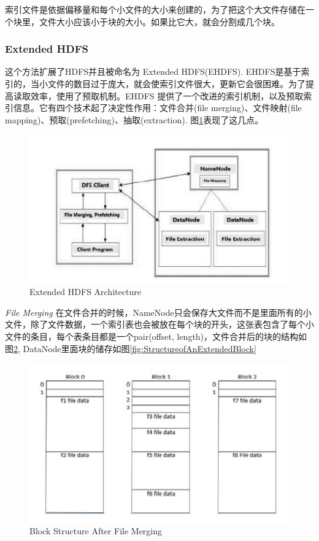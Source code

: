 \documentclass[UTF8]{ctexart}
\begin{document}
索引文件是依据偏移量和每个小文件的大小来创建的，为了把这个大文件存储在一个块里，文件大小应该小于块的大小。如果比它大，就会分割成几个块。


\subsubsection{Extended HDFS}
这个方法\cite{Gurav}扩展了HDFS并且被命名为 Extended HDFS(EHDFS). EHDFS是基于索引的，当小文件的数目过于庞大，就会使索引文件很大，更新它会很困难。为了提高读取效率，使用了预取机制。EHDFS 提供了一个改进的索引机制，以及预取索引信息。它有四个技术起了决定性作用：文件合并(file merging)、文件映射(file mapping)、预取(prefetching)、抽取(extraction). 图\ref{fig:ExtendedHDFSArchitecture}表现了这几点。

\begin{figure}[h]
\centering
\includegraphics{ExtendedHDFSArchitecture.PNG}
\caption{Extended HDFS Architecture}
\label{fig:ExtendedHDFSArchitecture}
\end{figure}

\emph{File Merging}
在文件合并的时候，NameNode只会保存大文件而不是里面所有的小文件，除了文件数据，一个索引表也会被放在每个块的开头，这张表包含了每个小文件的条目，每个表条目都是一个pair(offset, length)，文件合并后的块的结构如图\ref{fig:BlockStructureAfterFileMerging},
DataNode里面块的储存如图\ref{fig:StructureofAnExtendedBlock}

\begin{figure}[h]
\centering
\includegraphics{BlockStructureAfterFileMerging.PNG}
\caption{Block Structure After File Merging}
\label{fig:BlockStructureAfterFileMerging}
\end{figure}
\end{document}
